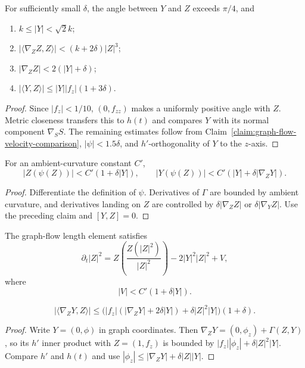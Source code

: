 \begin{claim}
\label{claim:graph-flow-angle-and-norm-bounds}
\label{1891}
For sufficiently small $\delta$, the angle between $Y$ and $Z$ exceeds
$\pi/4$, and
\begin{enumerate}
\item $k\le|Y|<\sqrt2k$;
\item $|\langle\nabla_ZZ,Z\rangle|<(k+2\delta)|Z|^3$;
\item $|\nabla_ZZ|<2(|Y|+\delta)$;
\item $|\langle Y,Z\rangle|\le|Y||f_z|(1+3\delta)$.
\end{enumerate}
\end{claim}
\begin{proof}
\sketch Since $|f_z|<1/10$, $(0,f_{zz})$ makes a uniformly positive angle with
$Z$. Metric closeness transfers this to $h(t)$ and compares $Y$ with its
normal component $\nabla_SS$. The remaining estimates follow from
Claim~\ref{claim:graph-flow-velocity-comparison}, $|\psi|<1.5\delta$, and
$h'$-orthogonality of $Y$ to the $z$-axis.
\end{proof}

\begin{claim}
\label{claim:graph-flow-connection-term-bounds}
\label{psiclaim}
For an ambient-curvature constant $C'$,
\[
|Z(\psi(Z))|<C'(1+\delta|Y|),
\qquad
|Y(\psi(Z))|<C'(|Y|+\delta|\nabla_ZY|).
\]
\end{claim}
\begin{proof}
\sketch Differentiate the definition of $\psi$. Derivatives of $\Gamma$ are
bounded by ambient curvature, and derivatives landing on $Z$ are controlled by
$\delta|\nabla_ZZ|$ or $\delta|\nabla_YZ|$. Use the preceding claim and
$[Y,Z]=0$.
\end{proof}

The graph-flow length element satisfies
\begin{equation}\label{Z_t}
\partial_t|Z|^2
=Z\left(\frac{Z(|Z|^2)}{|Z|^2}\right)-2|Y|^2|Z|^2+V,
\end{equation}
where
\begin{equation}\label{Vest}
|V|<C'(1+\delta|Y|).
\end{equation}

\begin{claim}
\label{claim:graph-flow-mixed-derivative-bound}
\[
|\langle\nabla_ZY,Z\rangle|
\le\bigl(|f_z|(|\nabla_ZY|+2\delta|Y|)+\delta|Z|^2|Y|\bigr)(1+\delta).
\]
\end{claim}
\begin{proof}
\sketch Write $Y=(0,\phi)$ in graph coordinates. Then
$\nabla_ZY=(0,\phi_z)+\Gamma(Z,Y)$, so its $h'$ inner product with
$Z=(1,f_z)$ is bounded by $|f_z||\phi_z|+\delta|Z|^2|Y|$. Compare $h'$ and
$h(t)$ and use $|\phi_z|\le|\nabla_ZY|+\delta|Z||Y|$.
\end{proof}

